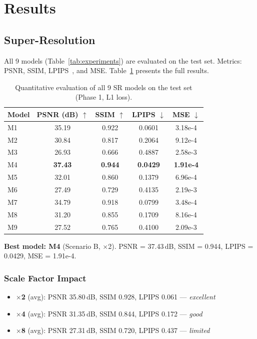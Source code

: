 \section{Results}
\label{sec:results}

\subsection{Super-Resolution}

All 9 models (Table~\ref{tab:experiments}) are evaluated on the test set.
Metrics: PSNR, SSIM, LPIPS~\cite{zhang2018}, and MSE.
Table~\ref{tab:metrics} presents the full results.

\begin{table}[H]
\centering
\caption{Quantitative evaluation of all 9 SR models on the test set (Phase 1, L1 loss).}
\label{tab:metrics}
\footnotesize
\renewcommand{\arraystretch}{1.0}
\begin{tabular}{@{}lcccc@{}}
\toprule
\textbf{Model} & \textbf{PSNR (dB)} $\uparrow$ & \textbf{SSIM} $\uparrow$ & \textbf{LPIPS} $\downarrow$ & \textbf{MSE} $\downarrow$ \\
\midrule
M1 & 35.19 & 0.922 & 0.0601 & 3.18e-4 \\
M2 & 30.84 & 0.817 & 0.2064 & 9.12e-4 \\
M3 & 26.93 & 0.666 & 0.4887 & 2.58e-3 \\
\midrule
M4 & \textbf{37.43} & \textbf{0.944} & \textbf{0.0429} & \textbf{1.91e-4} \\
M5 & 32.01 & 0.860 & 0.1379 & 6.96e-4 \\
M6 & 27.49 & 0.729 & 0.4135 & 2.19e-3 \\
\midrule
M7 & 34.79 & 0.918 & 0.0799 & 3.48e-4 \\
M8 & 31.20 & 0.855 & 0.1709 & 8.16e-4 \\
M9 & 27.52 & 0.765 & 0.4100 & 2.09e-3 \\
\bottomrule
\end{tabular}
\end{table}

\textbf{Best model: M4} (Scenario B, $\times$2).
PSNR = 37.43\,dB, SSIM = 0.944, LPIPS = 0.0429, MSE = 1.91e-4.

\subsubsection{Scale Factor Impact}

\begin{itemize}
    \item $\times$\textbf{2} (avg): PSNR 35.80\,dB, SSIM 0.928, LPIPS 0.061 --- \textit{excellent}
    \item $\times$\textbf{4} (avg): PSNR 31.35\,dB, SSIM 0.844, LPIPS 0.172 --- \textit{good}
    \item $\times$\textbf{8} (avg): PSNR 27.31\,dB, SSIM 0.720, LPIPS 0.437 --- \textit{limited}
\end{itemize}


